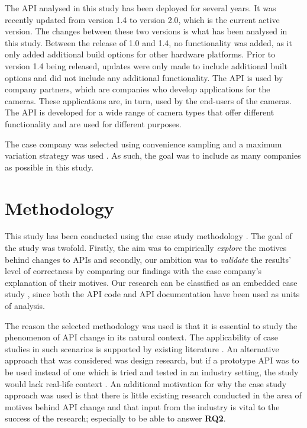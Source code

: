 \documentclass{sig-alternate}
\begin{document}
The API analysed in this study has been deployed for several years. It was recently updated from version 1.4 to version 2.0, which is the current active version. The changes between these two versions is what has been analysed in this study. Between the release of 1.0 and 1.4, no functionality was added, as it only added additional build options for other hardware platforms. Prior to version 1.4 being released, updates were only made to include additional built options and did not include any additional functionality. The API is used by company partners, which are companies who develop applications for the cameras. These applications are, in turn, used by the end-users of the cameras. The API is developed for a wide range of camera types that offer different functionality and are used for different purposes. 

The case company was selected using convenience sampling \cite{flyvbjerg2006five} and a maximum variation strategy was used \cite{benbasat1987case}. As such, the goal was to include as many companies as possible in this study.



\section{Methodology} \label{methodology}
This study has been conducted using the case study methodology \cite{runeson2009guidelines}. The goal of the study was twofold. Firstly, the aim was to empirically \textit{explore} the motives behind changes to APIs and secondly, our ambition was to \textit{validate} the results' level of correctness by comparing our findings with the case company's explanation of their motives. Our research can be classified as an embedded case study \cite{yin2013case}, since both the API code and API documentation have been used as units of analysis. 

The reason the selected methodology was used is that it is essential to study the phenomenon of API change in its natural context. The applicability of case studies in such scenarios is supported by existing literature \cite{benbasat1987case} \cite{runeson2009guidelines} \cite{yin2013case} \cite{robson2002real}. An alternative approach that was considered was design research, but if a prototype API was to be used instead of one which is tried and tested in an industry setting, the study would lack real-life context \cite{runeson2009guidelines}. An additional motivation for why the case study approach was used is that there is little existing research conducted in the area of motives behind API change and that input from the industry is vital to the success of the research; especially to be able to answer \textbf{RQ2}. 
\end{document}
